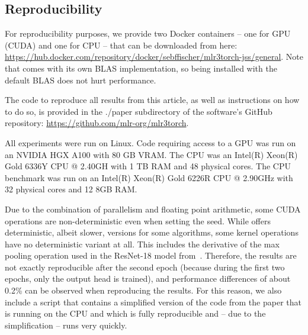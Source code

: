 \documentclass[article]{jss}
\theoremstyle{definition}
\begin{document}
\begin{appendix}

\newpage
\section{Reproducibility}\label{app:comp-details}

For reproducibility purposes, we provide two Docker containers -- one for GPU (CUDA) and one for CPU -- that can be downloaded from here: \url{https://hub.docker.com/repository/docker/sebffischer/mlr3torch-jss/general}.
Note that \torch{} comes with its own BLAS implementation, so \rlang{} being installed with the default BLAS does not hurt performance.

The code to reproduce all results from this article, as well as instructions on how to do so, is provided in the ./paper subdirectory of the software's GitHub repository: \url{https://github.com/mlr-org/mlr3torch}.

All experiments were run on Linux.
Code requiring access to a GPU was run on an NVIDIA HGX A100 with 80 GB VRAM.
The CPU was an Intel(R) Xeon(R) Gold 6336Y CPU @ 2.40GH with 1 TB RAM and 48 physical cores.
The CPU benchmark was run on an Intel(R) Xeon(R) Gold 6226R CPU @ 2.90GHz with 32 physical cores and 12 8GB RAM.

Due to the combination of parallelism and floating point arithmetic, some CUDA operations are non-deterministic even when setting the seed.
While \libtorch{} offers deterministic, albeit slower, versions for some algorithms, some kernel operations have no deterministic variant at all. This includes the derivative of the max pooling operation used in the ResNet-18 model from~.
Therefore, the results are not exactly reproducible after the second epoch (because during the first two epochs, only the output head is trained), and performance differences of about 0.2\% can be observed when reproducing the results.
For this reason, we also include a script that contains a simplified version of the code from the paper that is running on the CPU and which is fully reproducible and -- due to the simplification -- runs very quickly.
\end{appendix}
\end{document}
